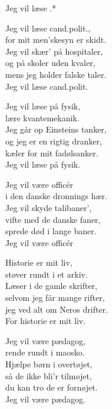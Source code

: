 \begin{song}{Jeg vil læse .*}
  \begin{SBVerse}
    Jeg vil læse cand.polit.,\\
    for mit men'skesyn er skidt.\\
    Jeg vil skær' på hospitaler,\\
    og på skoler uden kvaler,\\
    mens jeg holder falske taler.\\
    Jeg vil læse cand.polit.
  \end{SBVerse}

  \begin{SBVerse}
    Jeg vil læse på fysik,\\
    lære kvantemekanik.\\
    Jeg går op Einsteins tanker,\\
    og jeg er en rigtig dranker,\\
    kæler for mit fadølsanker.\\
    Jeg vil læse på fysik.
  \end{SBVerse}

  \begin{SBVerse}
    Jeg vil være officér\\
    i den danske dronnings hær.\\
    Jeg vil skyde talibaner',\\
    vifte med de danske faner,\\
    sprede død i lange baner.\\
    Jeg vil være officér
  \end{SBVerse}

  \begin{SBVerse}
    Historie er mit liv,\\
    støver rundt i et arkiv.\\
    Læser i de gamle skrifter,\\
    selvom jeg får mange rifter,\\
    jeg ved alt om Neros drifter.\\
    For historie er mit liv.
  \end{SBVerse}

  \begin{SBVerse}
    Jeg vil være pædagog,\\
    rende rundt i maosko.\\
    Hjælpe børn i overtøjet,\\
    så de ikke bli'r tilmøjet,\\
    du kan tro de er fornøjet.\\
    Jeg vil være pædagog.
  \end{SBVerse}


\end{song}
